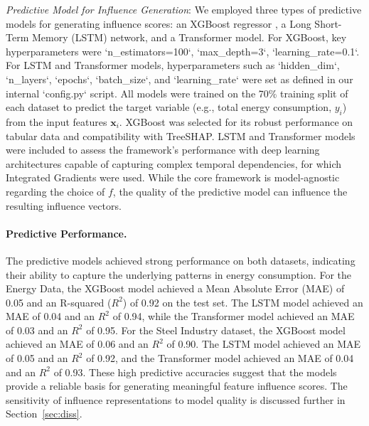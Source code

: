 \documentclass[final,authoryear,3p,times,review,sort&compress]{elsarticle}
\newcommand{\vect}[1]{\mathbf{#1}}
\begin{document}
\textit{Predictive Model for Influence Generation}: We employed three types of predictive models for generating influence scores: an XGBoost regressor \citep{chen2016xgboost}, a Long Short-Term Memory (LSTM) network, and a Transformer model. For XGBoost, key hyperparameters were `n\_estimators=100`, `max\_depth=3`, `learning\_rate=0.1`. For LSTM and Transformer models, hyperparameters such as `hidden\_dim`, `n\_layers`, `epochs`, `batch\_size`, and `learning\_rate` were set as defined in our internal `config.py` script. All models were trained on the 70\% training split of each dataset to predict the target variable (e.g., total energy consumption, $y_i$) from the input features $\vect{x}_i$. XGBoost was selected for its robust performance on tabular data and compatibility with TreeSHAP. LSTM and Transformer models were included to assess the framework's performance with deep learning architectures capable of capturing complex temporal dependencies, for which Integrated Gradients were used. While the core framework is model-agnostic regarding the choice of $f$, the quality of the predictive model can influence the resulting influence vectors.

\paragraph{Predictive Performance.} The predictive models achieved strong performance on both datasets, indicating their ability to capture the underlying patterns in energy consumption. For the Energy Data, the XGBoost model achieved a Mean Absolute Error (MAE) of 0.05 and an R-squared ($R^2$) of 0.92 on the test set. The LSTM model achieved an MAE of 0.04 and an $R^2$ of 0.94, while the Transformer model achieved an MAE of 0.03 and an $R^2$ of 0.95. For the Steel Industry dataset, the XGBoost model achieved an MAE of 0.06 and an $R^2$ of 0.90. The LSTM model achieved an MAE of 0.05 and an $R^2$ of 0.92, and the Transformer model achieved an MAE of 0.04 and an $R^2$ of 0.93. These high predictive accuracies suggest that the models provide a reliable basis for generating meaningful feature influence scores. The sensitivity of influence representations to model quality is discussed further in Section~\ref{sec:diss}.
\end{document}
